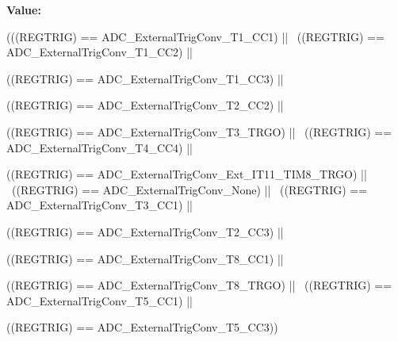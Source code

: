 \label{group__ADC__external__trigger__sources__for__regular__channels__conversion_gac74e6054adbedd72822cacde69105318}
{\bfseries Value:}
\begin{DoxyCode}
(((REGTRIG) == ADC_ExternalTrigConv_T1_CC1) || \
                                  ((REGTRIG) == ADC_ExternalTrigConv_T1_CC2) || \
      
                                  ((REGTRIG) == ADC_ExternalTrigConv_T1_CC3) || \
      
                                  ((REGTRIG) == ADC_ExternalTrigConv_T2_CC2) || \
      
                                  ((REGTRIG) == ADC_ExternalTrigConv_T3_TRGO) || 
      \
                                  ((REGTRIG) == ADC_ExternalTrigConv_T4_CC4) || \
      
                                  ((REGTRIG) == 
      ADC_ExternalTrigConv_Ext_IT11_TIM8_TRGO) || \
                                  ((REGTRIG) == ADC_ExternalTrigConv_None) || \
                                  ((REGTRIG) == ADC_ExternalTrigConv_T3_CC1) || \
      
                                  ((REGTRIG) == ADC_ExternalTrigConv_T2_CC3) || \
      
                                  ((REGTRIG) == ADC_ExternalTrigConv_T8_CC1) || \
      
                                  ((REGTRIG) == ADC_ExternalTrigConv_T8_TRGO) || 
      \
                                  ((REGTRIG) == ADC_ExternalTrigConv_T5_CC1) || \
      
                                  ((REGTRIG) == ADC_ExternalTrigConv_T5_CC3))
\end{DoxyCode}
